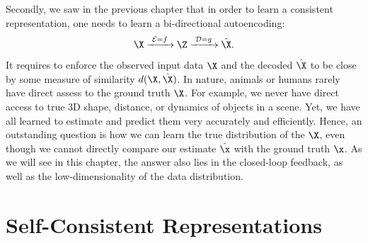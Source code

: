 \documentclass[../../book-main.tex]{subfiles}
\begin{document}
Secondly, we saw in the previous chapter that in order to learn a consistent representation, one needs to learn a bi-directional autoencoding:
\begin{equation}
 \X
\xrightarrow{\hspace{1mm} \mathcal{E} = f \hspace{1mm}} \Z  \xrightarrow{\hspace{1mm} \mathcal{D} = g \hspace{1mm}} \hat{\X}.
\end{equation}
It requires to enforce the observed input data $\X$ and the decoded $\hat \X$ to be close by some measure of similarity $d(\X, \hat \X)$. In nature, animals or humans rarely have direct assess to the ground truth $\X$. For example, we never have direct access to true 3D shape, distance, or dynamics of objects in a scene. Yet, we have all learned to estimate and predict them very accurately and efficiently. Hence, an outstanding question is how we can learn the true distribution of the $\X$, even though we cannot directly compare our estimate $\hat \x$ with the ground truth $\x$. As we will see in this chapter, the answer also  lies in the closed-loop feedback, as well as the low-dimensionality of the data distribution. 


\section{Self-Consistent Representations}

\end{document}
